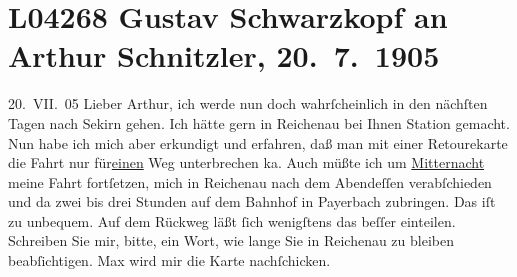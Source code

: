 

\section[Gustav Schwarzkopf an Arthur Schnitzler, 20. 7. 1905]{L04268 Gustav Schwarzkopf an Arthur Schnitzler, 20. 7. 1905}
\nopagebreak{}
\rehead{ }\normalsize\beginnumbering{}
\toendnotes[C]{\smallbreak\pagebreak[2]}
\toendnotes[C]{\smallbreak}
\toendnotes[C]{\smallbreak}
\pstart
           \raggedleft{}{\pb}20. VII. 05\pend
           \vspace{0.5em}
\pstart
           Lieber Arthur, ich werde nun doch wahrſcheinlich in den nächſten
               Tagen nach Sekirn gehen. Ich hätte gern in Reichenau bei Ihnen Station gemacht. Nun habe ich
               mich aber erkundigt und erfahren, daß man mit einer Retourekarte die Fahrt nur für\uline{einen} Weg unterbrechen ka{\geminationn}. Auch müßte ich um \uline{Mitternacht} meine Fahrt
               fortſetzen, mich in Reichenau nach dem Abendeſſen
               verabſchieden und da{\geminationn} zwei bis drei Stunden auf dem Bahnhof in Payerbach zubringen. {\pb}Das iſt zu unbequem. Auf dem Rückweg
               läßt{ }ſich wenigſtens das beſſer einteilen. Schreiben Sie mir, bitte, ein Wort, wie
               lange Sie in Reichenau zu bleiben beabſichtigen.
                  Max wird mir die Karte nachſchicken.\pend
           
